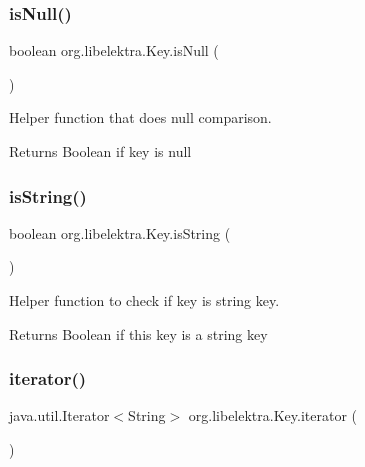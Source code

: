 \subsubsection{\texorpdfstring{isNull()}{isNull()}}
{\footnotesize\ttfamily boolean org.\+libelektra.\+Key.\+is\+Null (\begin{DoxyParamCaption}{ }\end{DoxyParamCaption})\hspace{0.3cm}{\ttfamily [inline]}}



Helper function that does null comparison. 

\begin{DoxyReturn}{Returns}
Boolean if key is null 
\end{DoxyReturn}
\mbox{\label{classorg_1_1libelektra_1_1Key_acb0e1141fa920b798a66a2076cd61562}} 
\subsubsection{\texorpdfstring{isString()}{isString()}}
{\footnotesize\ttfamily boolean org.\+libelektra.\+Key.\+is\+String (\begin{DoxyParamCaption}{ }\end{DoxyParamCaption})\hspace{0.3cm}{\ttfamily [inline]}}



Helper function to check if key is string key. 

\begin{DoxyReturn}{Returns}
Boolean if this key is a string key 
\end{DoxyReturn}
\mbox{\label{classorg_1_1libelektra_1_1Key_ad948a4ab2d5142b439830ddc5c16cc38}} 
\subsubsection{\texorpdfstring{iterator()}{iterator()}}
{\footnotesize\ttfamily java.\+util.\+Iterator$<$String$>$ org.\+libelektra.\+Key.\+iterator (\begin{DoxyParamCaption}{ }\end{DoxyParamCaption})\hspace{0.3cm}{\ttfamily [inline]}}



